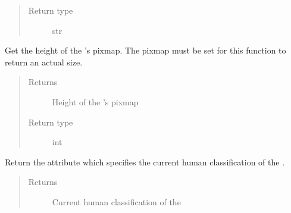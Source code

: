 \documentclass[letterpaper,10pt,english]{sphinxmanual}
\begin{document}
\begin{fulllineitems}
\begin{fulllineitems}
\begin{quote}
\begin{description}
\item[{Return type}] \leavevmode
str

\end{description}\end{quote}

\end{fulllineitems}


\begin{fulllineitems}
\label{\detokenize{polo.crystallography:polo.crystallography.image.Image.height}}
Get the height of the 
{\hyperref[\detokenize{polo.crystallography:polo.crystallography.image.Image}]{}}’s pixmap. 
The pixmap must be set for this function to 
return an actual size.
\begin{quote}\begin{description}
\item[{Returns}] \leavevmode
Height of the {\hyperref[\detokenize{polo.crystallography:polo.crystallography.image.Image}]{}}’s pixmap

\item[{Return type}] \leavevmode
int

\end{description}\end{quote}

\end{fulllineitems}


\begin{fulllineitems}
\label{\detokenize{polo.crystallography:polo.crystallography.image.Image.human_class}}
Return the {\hyperref[\detokenize{polo.crystallography:polo.crystallography.image.Image.human_class}]{}}
attribute which specifies the current human classification of the
{\hyperref[\detokenize{polo.crystallography:polo.crystallography.image.Image}]{}}.
\begin{quote}\begin{description}
\item[{Returns}] \leavevmode
Current human classification of the
{\hyperref[\detokenize{polo.crystallography:polo.crystallography.image.Image}]{}}


\end{description}
\end{quote}
\end{fulllineitems}
\end{fulllineitems}
\end{document}
